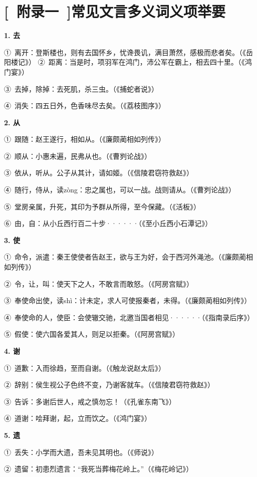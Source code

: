 
\section{[\ 附录一\ ]常见文言多义词义项举要}

\textbf{1. 去}

①\ 离开：登斯楼也，则有去国怀乡，忧谗畏讥，满目萧然，感极而悲者矣。（《岳阳楼记》）
②\ 距离：当是时，项羽军在鸿门，沛公军在霸上，相去四十里。（《鸿门宴》）

③\ 去掉，除掉：去死肌，杀三虫。（《捕蛇者说》）

④\ 消失：四五日外，色香味尽去矣。（《荔枝图序》）

\textbf{2. 从}

①\ 跟随：赵王遂行，相如从。（《廉颇蔺相如列传》）

②\ 顺从：小惠未遍，民弗从也。（《曹刿论战》）

③\ 依从，听从。公子从其计，请如姬。（《信陵君窃符救赵》）

④\ 随行，侍从，读zòng：忠之属也，可以一战。战则请从。（《曹刿论战》）

⑤\ 堂房亲属，升死，其印为予群从所得，至今保藏。（《活板》）

⑥\ 由，自：从小丘西行百二十步······（《至小丘西小石潭记》）

\textbf{3. 使}

①\ 命令，派遣：秦王使使者告赵王，欲与王为好，会于西河外渑池。（《廉颇蔺相如列传》）

②\ 令，让，叫：使天下之人，不敢言而敢怒。（《阿房宫赋》）

③\ 奉使命出使，读shì：计未定，求人可使报秦者，未得。（《廉颇蔺相如列传》）

④\ 奉使命的人，使臣：会使辙交驰，北邀当国者相见······（《指南录后序》）

⑤\ 假使：使六国各爱其人，则足以拒秦。（《阿房宫赋》）

\textbf{4. 谢}

①\ 道歉：入而徐趋，至而自谢。（《触龙说赵太后》）

②\ 辞别：侯生视公子色终不变，乃谢客就车。（《信陵君窃符救赵》）

③\ 告诉：多谢后世人，戒之慎勿忘！（《孔雀东南飞》）

④\ 道谢：哙拜谢，起，立而饮之。（《鸿门宴》）

\textbf{5. 遗}

①\ 丢失：小学而大遗，吾未见其明也。（《师说》）

②\ 遗留：初患烈遗言：“我死当葬梅花岭上。”（《梅花岭记》）

